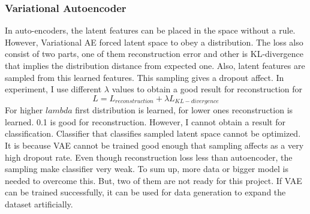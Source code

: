 \documentclass[12pt, letterpaper]{article}
\begin{document}
\subsubsection{Variational Autoencoder}
	In auto-encoders, the latent features can be placed in the space without a rule. However, Variational AE forced latent space to obey a distribution. The loss also consist of two parts, one of them reconstruction error and other is KL-divergence that implies the distribution distance from expected one. Also, latent features are sampled from this learned features. This sampling gives a dropout affect.
	In experiment, I use different $\lambda$ values to obtain a good result for reconstruction for
	$$L = L_{reconstruction} + \lambda L_{KL-divergence}$$
For higher $lambda$ first distribution is learned, for lower ones reconstruction is learned. 0.1 is good for reconstruction. However, I cannot obtain a result for classification. Classifier that classifies sampled latent space cannot be optimized. It is because VAE cannot be trained good enough that sampling affects as a very high dropout rate. Even though reconstruction loss less than autoencoder, the sampling make classifier very weak. To sum up, more data or bigger model is needed to overcome this. But, two of them are not ready for this project. If VAE can be trained successfully, it can be used for data generation to expand the dataset artificially.
\end{document}
